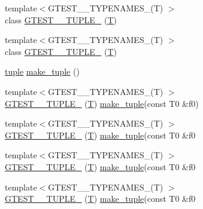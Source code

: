 \begin{DoxyCompactItemize}
\item 
{\footnotesize template$<$G\-T\-E\-S\-T\-\_\-\_\-\-T\-Y\-P\-E\-N\-A\-M\-E\-S\-\_\-(\-T) $>$ }\\class \hyperlink{namespacestd_1_1tr1_ab2b1c72e9db7436909d9ac011645f29d}{G\-T\-E\-S\-T\-\_\-\_\-\-T\-U\-P\-L\-E\-\_\-} (\hyperlink{calib3d_8hpp_a3efb9551a871ddd0463079a808916717}{T})
\item 
{\footnotesize template$<$G\-T\-E\-S\-T\-\_\-\_\-\-T\-Y\-P\-E\-N\-A\-M\-E\-S\-\_\-(\-T) $>$ }\\class \hyperlink{namespacestd_1_1tr1_ab4f2c7d5458171bec6c4330fc5c7aba6}{G\-T\-E\-S\-T\-\_\-\_\-\-T\-U\-P\-L\-E\-\_\-} (\hyperlink{calib3d_8hpp_a3efb9551a871ddd0463079a808916717}{T})
\item 
\hyperlink{classstd_1_1tr1_1_1tuple}{tuple} \hyperlink{namespacestd_1_1tr1_af7e12a0f5b5791b5b7c49a5a17b85359}{make\-\_\-tuple} ()
\item 
{\footnotesize template$<$G\-T\-E\-S\-T\-\_\-\_\-\-T\-Y\-P\-E\-N\-A\-M\-E\-S\-\_\-(\-T) $>$ }\\\hyperlink{namespacestd_1_1tr1_a8b196fb65b7521a688f59c51418ab191}{G\-T\-E\-S\-T\-\_\-\_\-\-T\-U\-P\-L\-E\-\_\-} (\hyperlink{calib3d_8hpp_a3efb9551a871ddd0463079a808916717}{T}) \hyperlink{namespacestd_1_1tr1_af7e12a0f5b5791b5b7c49a5a17b85359}{make\-\_\-tuple}(const T0 \&f0)
\item 
{\footnotesize template$<$G\-T\-E\-S\-T\-\_\-\_\-\-T\-Y\-P\-E\-N\-A\-M\-E\-S\-\_\-(\-T) $>$ }\\\hyperlink{namespacestd_1_1tr1_a90d9f0e7f95fa1c2093372d72493c3c1}{G\-T\-E\-S\-T\-\_\-\_\-\-T\-U\-P\-L\-E\-\_\-} (\hyperlink{calib3d_8hpp_a3efb9551a871ddd0463079a808916717}{T}) \hyperlink{namespacestd_1_1tr1_af7e12a0f5b5791b5b7c49a5a17b85359}{make\-\_\-tuple}(const T0 \&f0
\item 
{\footnotesize template$<$G\-T\-E\-S\-T\-\_\-\_\-\-T\-Y\-P\-E\-N\-A\-M\-E\-S\-\_\-(\-T) $>$ }\\\hyperlink{namespacestd_1_1tr1_a4493d91e61718415264f7e72fea42930}{G\-T\-E\-S\-T\-\_\-\_\-\-T\-U\-P\-L\-E\-\_\-} (\hyperlink{calib3d_8hpp_a3efb9551a871ddd0463079a808916717}{T}) \hyperlink{namespacestd_1_1tr1_af7e12a0f5b5791b5b7c49a5a17b85359}{make\-\_\-tuple}(const T0 \&f0
\item 
{\footnotesize template$<$G\-T\-E\-S\-T\-\_\-\_\-\-T\-Y\-P\-E\-N\-A\-M\-E\-S\-\_\-(\-T) $>$ }\\\hyperlink{namespacestd_1_1tr1_a4e57e6fab4219802275bd31821b31b58}{G\-T\-E\-S\-T\-\_\-\_\-\-T\-U\-P\-L\-E\-\_\-} (\hyperlink{calib3d_8hpp_a3efb9551a871ddd0463079a808916717}{T}) \hyperlink{namespacestd_1_1tr1_af7e12a0f5b5791b5b7c49a5a17b85359}{make\-\_\-tuple}(const T0 \&f0

\end{DoxyCompactItemize}
